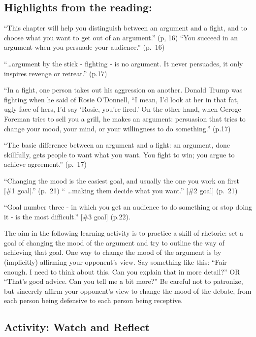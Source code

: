 \documentclass[
]{book}
\begin{document}
\hypertarget{highlights-from-the-reading-4}{%
\subsection{Highlights from the reading:}\label{highlights-from-the-reading-4}}

``This chapter will help you distinguish between an argument and a fight, and to choose what you want to get out of an argument.'' (p, 16)
``You succeed in an argument when you persuade your audience.'' (p.~16)

``\ldots argument by the stick - fighting - is no argument. It never persuades, it only inspires revenge or retreat.'' (p.17)

``In a fight, one person takes out his aggression on another. Donald Trump was fighting when he said of Rosie O'Donnell, ``I mean, I'd look at her in that fat, ugly face of hers, I'd say `Rosie, you're fired.' On the other hand, when Geroge Foreman tries to sell you a grill, he makes an argument: persuasion that tries to change your mood, your mind, or your willingness to do something.'' (p.17)

``The basic difference between an argument and a fight: an argument, done skillfully, gets people to want what you want. You fight to win; you argue to achieve agreement.'' (p.~17)

``Changing the mood is the easiest goal, and usually the one you work on first {[}\#1 goal{]}.'' (p.~21)
`` \ldots making them decide what you want.'' {[}\#2 goal{]} (p.~21)

``Goal number three - in which you get an audience to do something or stop doing it - is the most difficult.'' {[}\#3 goal{]} (p.22).

The aim in the following learning activity is to practice a skill of rhetoric: set a goal of changing the mood of the argument and try to outline the way of achieving that goal. One way to change the mood of the argument is by (implicitly) affirming your opponent's view. Say something like this: ``Fair enough. I need to think about this. Can you explain that in more detail?'' OR ``That's good advice. Can you tell me a bit more?'' Be careful not to patronize, but sincerely affirm your opponent's view to change the mood of the debate, from each person being defensive to each person being receptive.

\hypertarget{activity-watch-and-reflect-5}{%
\subsection*{Activity: Watch and Reflect}\label{activity-watch-and-reflect-5}}
\end{document}
